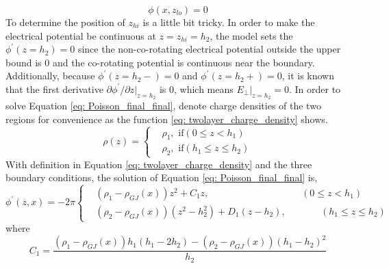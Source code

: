 \documentclass[12pt]{report}
\begin{document}
      \begin{equation}
        \label{eq: lower_boundary}
        \phi \left(x, z_{lo}\right) = 0
      \end{equation}
      To determine the position of $z_{hi}$ is a little bit tricky. In order to make the electrical 
      potential be continuous at $z = z_{hi} = h_2$, the model sets the 
      $\phi^{\prime}\left(z=h_{2}\right) = 0$ since the non-co-rotating electrical potential 
      outside the upper bound is $0$ and the co-rotating potential is continuous near the 
      boundary. Additionally, because $\phi^{\prime}\left(z=h_{2}-\right) = 0$
      and $\phi^{\prime}\left(z=h_{2}+\right) = 0$, it is known that the first derivative 
      $\partial{\phi^{\prime}}/\partial{z}\vert_{z=h_{2}}$ is $0$, which means 
      $E_{\perp}\vert_{z=h_{2}} = 0$. In order to solve Equation \ref{eq: Poisson_final_final}, 
      denote charge densities of the two regions for convenience as the function 
      \ref{eq: twolayer_charge_density} shows.
      \begin{equation}
        \label{eq: twolayer_charge_density}
          \rho\left(z\right) = 
          \begin{cases}
             & \rho_{1} , \text{    if} \left(0 \leq z < h_{1}\right)\\
             & \rho_{2} , \text{    if} \left(h_{1} \leq z \leq h_{2}\right) 
          \end{cases}       
      \end{equation}
      With definition in Equation \ref{eq: twolayer_charge_density} and the three boundary 
      conditions, the solution of Equation \ref{eq: Poisson_final_final} is, 
      \begin{equation}
        \label{eq: twolayer_potential}
          \phi^{\prime}\left(z, x\right) = -2\pi
          \left\{\begin{alignedat}{2}
             & \left(\rho_{1} - \rho_{GJ}\left(x\right)\right)z^2 + C_{1} z ,  &&\left(0 \leq z < h_{1}\right)\\
             & \left(\rho_{2}-\rho_{GJ}\left(x\right)\right)\left(z^2 - h_2^2\right) + D_{1} \left(z-h_2\right),  &&\qquad \left(h_{1} \leq z \leq h_{2}\right) 
          \end{alignedat}\right.
      \end{equation}
      where 
      \begin{equation*}
        C_{1} = \frac{\left(\rho_{1}-\rho_{GJ}\left(x\right)\right)h_1\left(h_1-2h_2\right)-\left(\rho_2-\rho_{GJ}\left(x\right)\right)\left(h_1-h_2\right)^2}{h_2} 
      \end{equation*}
\end{document}
